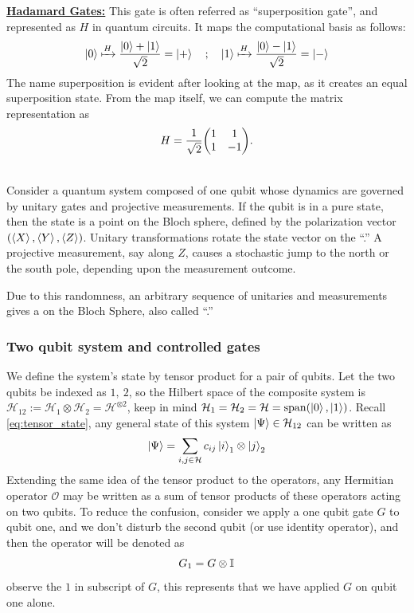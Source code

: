\documentclass[11pt, oneside, listof=totoc]{scrbook}
\renewcommand{\H}{\mathcal{H}}
\renewcommand{\O}{\mathcal{O}}
\newcommand{\ku}{\ket{0}}
\newcommand{\kd}{\ket{1}}
\newcommand{\kr}{\ket{+}}
\newcommand{\kl}{\ket{-}}
\begin{document}
{\bfseries \uline{Hadamard Gates:}} This gate is often referred as ``superposition gate'', and represented as \(H\) in quantum circuits. It maps the computational basis as follows:
\begin{equation*}
    \ku \xmapsto{H} \frac{\ku + \kd}{\sqrt{2}} = \kr \quad ; \quad \kd \xmapsto{H} \frac{\ku - \kd}{\sqrt{2}} = \kl
\end{equation*}
The name superposition is evident after looking at the map, as it creates an equal superposition state. From the map itself, we can compute the matrix representation as
\begin{equation}\label{eq:hadamard}
    H = \frac{1}{\sqrt{2}} \mqty(1 & 1 \\ 1 & -1).
\end{equation}

\\
Consider a quantum system composed of one qubit whose dynamics are governed by unitary gates and projective measurements. If the qubit is in a pure state, then the state is a point on the Bloch sphere, defined by the polarization vector $(\expval{X}, \expval{Y}, \expval{Z})$. Unitary transformations rotate the state vector on the ``.'' A projective measurement, say along \(Z\), causes a stochastic jump to the north or the south pole, depending upon the measurement outcome.

Due to this randomness, an arbitrary sequence of unitaries and measurements gives a  on the Bloch Sphere, also called ``.''

\subsubsection{Two qubit system and controlled gates}

We define the system's state by tensor product for a pair of qubits. Let the two qubits be indexed as \(1, ~2\), so the Hilbert space of the composite system is \(\H_{12} := \H_1 \otimes \H_2 = \H^{\otimes 2}\), keep in mind \(\H_1 = \H_2 = \H = \Span(\ku, \kd)\). Recall \cref{eq:tensor_state}, any general state of this system \(\ket{\Psi} \in \H_{12}\) can be written as
\[
    \ket{\Psi} = \sum_{i, j \in \H} c_{i j} \ket{i}_1 \otimes \ket{j}_2
\]
Extending the same idea of the tensor product to the operators, any Hermitian operator \(\O\) may be written as a sum of tensor products of these operators acting on two qubits. To reduce the confusion, consider we apply a one qubit gate \(G\) to qubit one, and we don't disturb the second qubit (or use identity operator), and then the operator will be denoted as
\[
    G_1 = G \otimes \mathbb{I}_{}
\]
observe the \(1\) in subscript of \(G\), this represents that we have applied \(G\) on qubit one alone.\\
\end{document}
